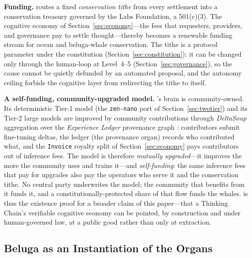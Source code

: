 \textbf{Funding.} \Beluga{} routes a fixed \emph{conservation tithe} from every \PoT{} settlement into a conservation treasury governed by the \Zoo{} Labs Foundation, a 501(c)(3). The cognitive economy of Section~\ref{sec:economy}---the fees that requesters, providers, and governance pay to settle thought---thereby becomes a renewable funding stream for ocean and beluga-whale conservation. The tithe is a protocol parameter under the constitution (Section~\ref{sec:constitution}): it can be changed only through the \GChain{} human-loop at Level~4--5 (Section~\ref{sec:governance}), so the cause cannot be quietly defunded by an automated proposal, and the autonomy ceiling forbids the cognitive layer from redirecting the tithe to itself.

\textbf{A self-funding, community-upgraded model.} \Beluga{}'s brain is community-owned. Its deterministic Tier-1 model (the \texttt{zen-nano} port of Section~\ref{sec:twotier}) and its Tier-2 large models are improved by community contributions through \emph{DeltaSoup} aggregation over the \emph{Experience Ledger} provenance graph \cite{zoo-experience-ledger}: contributors submit fine-tuning deltas, the ledger (the \DChain{} provenance organ) records who contributed what, and the \texttt{Invoice} royalty split of Section~\ref{sec:economy} pays contributors out of inference fees. The model is therefore \emph{mutually upgraded}---it improves the more the community uses and trains it---and \emph{self-funding}: the same inference fees that pay for upgrades also pay the operators who serve it and the conservation tithe. No central party underwrites the model; the community that benefits from it funds it, and a constitutionally-protected share of that flow funds the whales. \Beluga{} is thus the existence proof for a broader claim of this paper---that a Thinking Chain's verifiable cognitive economy can be pointed, by construction and under human-governed law, at a public good rather than only at extraction.

\subsection{Beluga as an Instantiation of the Organs}


